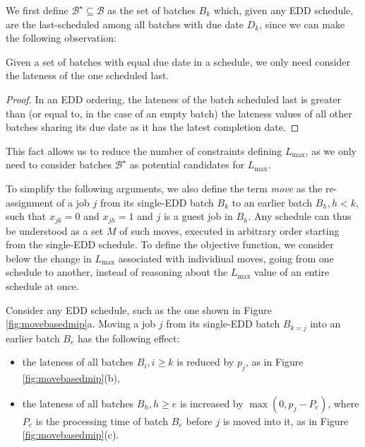 \documentclass[oribibl]{llncs}
\def\Lmax{{L_{\mathrm{max}}}}
\begin{document}
We first define $\mathcal{B}^\star \subseteq \mathcal{B}$ as the set of batches
$B_k$ which, given any EDD schedule, are the last-scheduled among all batches
with due date $D_k$, since we can make the following observation:
\begin{proposition}
Given a set of batches with equal due date in a schedule, we only need
consider the lateness of the one scheduled last.
\end{proposition}
\begin{proof}
  In an EDD ordering, the lateness of the batch scheduled last is greater
  than (or equal to, in the case of an empty batch) the lateness values
  of all other batches sharing its due date as it has the latest completion
  date.
\end{proof}
This fact allows us to reduce the number of constraints defining $\Lmax$, as
we only need to consider batches $\mathcal{B}^\star$ as potential candidates for
$\Lmax$.

To simplify the following arguments, we also define the term
\textit{move} as the re-assignment of a job $j$ from its single-EDD
batch $B_k$ to an earlier batch $B_h, h < k$, such that $x_{jk}=0$ and $x_{jh}=1$ and $j$
is a guest job in $B_h$.
Any schedule can thus be understood as a set $M$ of such moves, executed in arbitrary
order starting from the single-EDD schedule. To define the objective function,
we consider below the change in $\Lmax$ associated with individiual moves, going
from one schedule to another, instead of reasoning about the $\Lmax$ value of an entire schedule at once.

Consider any EDD
schedule, such as the one shown in Figure \ref{fig:movebasedmip}a. Moving
a job $j$ from its single-EDD batch $B_{k=j}$ into an earlier batch
$B_e$ has the following effect:

\begin{itemize}
\item{the lateness of all batches $B_i, i \geq k$ is reduced by $p_j$,
    as in Figure \ref{fig:movebasedmip}(b),}
\item{the lateness of all batches $B_h, h \geq e$ is increased by
$\max(0,p_j - P_e)$, where $P_e$ is the processing time of batch $B_e$
before $j$ is moved into it, as in Figure \ref{fig:movebasedmip}(c).}
\end{itemize}
\end{document}
